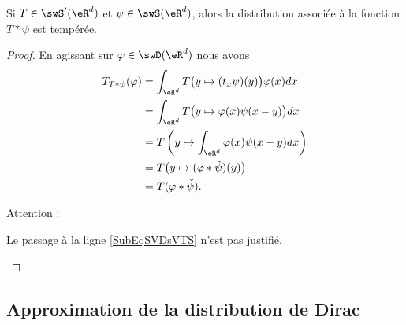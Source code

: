 \begin{proposition} \label{PropZMKYMKI}
	Si \( T\in\swS'(\eR^d)\) et \( \psi\in\swS(\eR^d)\), alors la distribution associée à la fonction \( T*\psi\) est tempérée.
\end{proposition}

\begin{proof}
	En agissant sur \( \varphi\in\swD(\eR^d)\) nous avons
	\begin{subequations}
		\begin{align}
			T_{T*\psi}(\varphi) & =\int_{\eR^d}T\big( y\mapsto (t_x\psi)(y) \big)\varphi(x)dx                         \\
			                    & =\int_{\eR^d}T\big( y\mapsto \varphi(x)\psi(x-y) \big)dx                            \\
			                    & =T\left( y\mapsto\int_{\eR^d}\varphi(x)\psi(x-y)dx \right)     \label{SubEqSVDsVTS} \\
			                    & =T\big(y\mapsto (\varphi*\check\psi)(y)\big)                                        \\
			                    & =T(\varphi*\check\psi).
		\end{align}
	\end{subequations}

	Attention :
	\begin{probleme}
		Le passage à la ligne \eqref{SubEqSVDsVTS} n'est pas justifié.
	\end{probleme}
\end{proof}

\subsection{Approximation de la distribution de Dirac}


